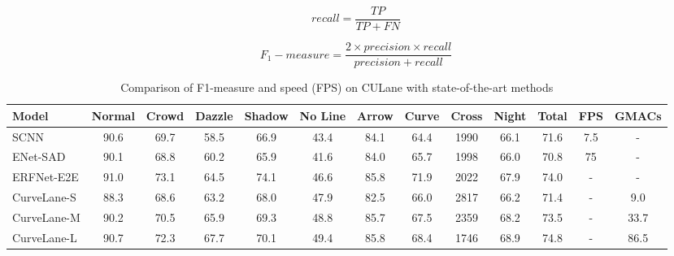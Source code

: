 \documentclass[conference]{IEEEtran}
\begin{document}
\begin{equation}
recall = \frac{TP}{TP+FN}
\end{equation}

\begin{equation}
    F_{1}-measure = \frac{2\times precision \times recall}{precision+recall}
\end{equation}

\begin{table*}[t]
\addtolength{\tabcolsep}{-2.5pt}
\begin{center}
\caption{Comparison of F1-measure and speed (FPS) on CULane with state-of-the-art methods}
\label{ta:results}


 \normalsize 
\begin{tabular}{|@{}l|c|c|c|c|c|c|c|c|c|c|c|@{}c|}
\hline
 \textbf{Model}                     & \textbf{Normal} & \textbf{Crowd} & \textbf{Dazzle} & \textbf{Shadow} & \textbf{No Line} & \textbf{Arrow} & \textbf{Curve} & \textbf{Cross} & \textbf{Night} & \textbf{Total} & \textbf{FPS} & \textbf{GMACs}\\ \hline
 SCNN\cite{pan2018SCNN}             & 90.6          & 69.7          & 58.5          & 66.9          & 43.4          & 84.1          & 64.4          & 1990          & 66.1          & 71.6          & 7.5   & - \\
 \hline
  ENet-SAD\cite{hou2019learning}    & 90.1          & 68.8          & 60.2          & 65.9          & 41.6          & 84.0          & 65.7          & 1998          & 66.0          & 70.8          & 75    & -\\
  \hline
 ERFNet-E2E \cite{yoo2020end}       & 91.0          & 73.1          & 64.5          & 74.1          & 46.6          & 85.8          & 71.9          & 2022          & 67.9          & 74.0          & -     & -\\
\hline
 CurveLane-S\cite{CurveLane-NAS}    & 88.3          & 68.6          & 63.2          & 68.0          & 47.9          & 82.5          & 66.0          & 2817          & 66.2          & 71.4          & -     & 9.0 \\
 CurveLane-M\cite{CurveLane-NAS}    & 90.2          & 70.5          & 65.9          & 69.3          & 48.8          & 85.7          & 67.5          & 2359          & 68.2          & 73.5          & -     & 33.7 \\
 CurveLane-L\cite{CurveLane-NAS}    & 90.7          & 72.3          & 67.7          & 70.1          & 49.4          & 85.8          & 68.4          & 1746          & 68.9          & 74.8          & -     & 86.5 \\

\end{tabular}
\end{center}
\end{table*}
\end{document}
